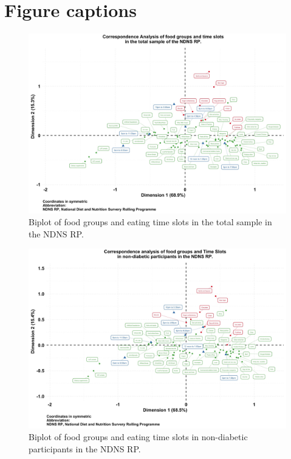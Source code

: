 \documentclass[utf8]{frontiersSCNS}
\begin{document}
\newpage
\begin{landscape}

\hypertarget{section}{%
\section*{}\label{section}}

\section*{Figure captions}

\begin{figure}[!ht]
\begin{center}
\includegraphics[width=21.5cm]{Fig1.jpg}
\end{center}
\caption{Biplot of food groups and eating time slots in the total sample in the NDNS RP.}\label{fig:fig1}
\end{figure}

\begin{figure}[!ht]
\begin{center}
\includegraphics[width=21.5cm]{Fig2.jpg}
\end{center}
\caption{Biplot of food groups and eating time slots in non-diabetic participants in the NDNS RP.}\label{fig:fig2}
\end{figure}


\end{landscape}
\end{document}
